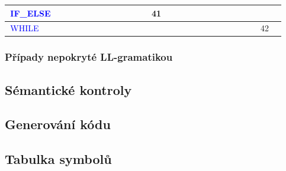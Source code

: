 \documentclass[a4paper]{article}
\theoremstyle{definition}
\newcommand{\nter}[1]{\textcolor{blue}{\,#1\,}}
\begin{document}
\begin{center}
{\begin{tabular}{| l || c | c | c | c | c | c | c | c | c | c | c | c | c | c | c | c | c | c | c | c | c | c | c | c | c |}
	\nter{IF\_ELSE}    &         &         &         &         &         &          &            &           &                &              &          &   41     &               &                &                   &                   &             &           &              &               &              &              &            &             & \\\hline
	\nter{WHILE}       &         &         &         &         &         &          &            &           &                &              &          &          &               &                &                   &                   &             &           &              &               &              &              &            &    42       & \\

\end{tabular}
}
\end{center}

\subsubsection{Případy nepokryté LL-gramatikou} %



\subsection{Sémantické kontroly}%

\subsection{Generování kódu}%

\subsection{Tabulka symbolů}%
\end{document}
